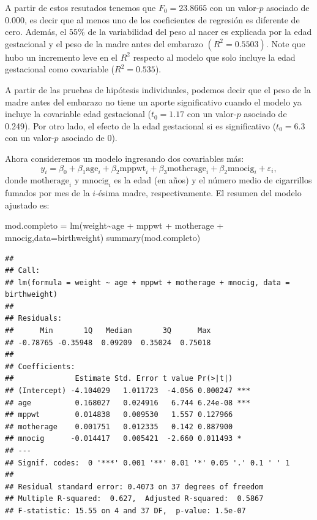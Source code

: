 \documentclass[
]{article}
\newenvironment{Shaded}{\begin{snugshade}}{\end{snugshade}}
\newcommand{\AttributeTok}[1]{\textcolor[rgb]{0.77,0.63,0.00}{#1}}
\newcommand{\FunctionTok}[1]{\textcolor[rgb]{0.00,0.00,0.00}{#1}}
\newcommand{\NormalTok}[1]{#1}
\newcommand{\OtherTok}[1]{\textcolor[rgb]{0.56,0.35,0.01}{#1}}
\newcommand{\SpecialCharTok}[1]{\textcolor[rgb]{0.00,0.00,0.00}{#1}}
\begin{document}
A partir de estos resutados tenemos que \(F_{0}=23.8665\) con un valor-\(p\) asociado de \(0.000\), es decir que al menos uno de los coeficientes de regresión es diferente de cero. Además, el \(55\)\% de la variabilidad del peso al nacer es explicada por la edad gestacional y el peso de la madre antes del embarazo \((R^{2}=0.5503)\). Note que hubo un incremento leve en el \(R^{2}\) respecto al modelo que solo incluye la edad gestacional como covariable (\(R^{2} = 0.535\)).

A partir de las pruebas de hipótesis individuales, podemos decir que el peso de la madre antes del embarazo no tiene un aporte significativo cuando el modelo ya incluye la covariable edad gestacional (\(t_{0}=1.17\) con un valor-\(p\) asociado de 0.249). Por otro lado, el efecto de la edad gestacional si es significativo (\(t_{0}=6.3\) con un valor-\(p\) asociado de 0).

Ahora consideremos un modelo ingresando dos covariables más:
\[
y_{i} = \beta_{0} + \beta_{1}\mbox{age}_{i} + \beta_{2}\mbox{mppwt}_{i} + \beta_{3}\mbox{motherage}_{i} + \beta_{2}\mbox{mnocig}_{i} + \varepsilon_{i},
\]
donde \(\mbox{motherage}_{i}\) y \(\mbox{mnocig}_{i}\) es la edad (en años) y el número medio de cigarrillos fumados por mes de la \(i\)-ésima madre, respectivamente. El resumen del modelo ajustado es:

\begin{Shaded}
\begin{Highlighting}[]
\NormalTok{mod.completo }\OtherTok{=} \FunctionTok{lm}\NormalTok{(weight}\SpecialCharTok{\textasciitilde{}}\NormalTok{age }\SpecialCharTok{+}\NormalTok{ mppwt }\SpecialCharTok{+}\NormalTok{ motherage }\SpecialCharTok{+}\NormalTok{ mnocig,}\AttributeTok{data=}\NormalTok{birthweight)}
\FunctionTok{summary}\NormalTok{(mod.completo)}
\end{Highlighting}
\end{Shaded}

\begin{verbatim}
## 
## Call:
## lm(formula = weight ~ age + mppwt + motherage + mnocig, data = birthweight)
## 
## Residuals:
##      Min       1Q   Median       3Q      Max 
## -0.78765 -0.35948  0.09209  0.35024  0.75018 
## 
## Coefficients:
##              Estimate Std. Error t value Pr(>|t|)    
## (Intercept) -4.104029   1.011723  -4.056 0.000247 ***
## age          0.168027   0.024916   6.744 6.24e-08 ***
## mppwt        0.014838   0.009530   1.557 0.127966    
## motherage    0.001751   0.012335   0.142 0.887900    
## mnocig      -0.014417   0.005421  -2.660 0.011493 *  
## ---
## Signif. codes:  0 '***' 0.001 '**' 0.01 '*' 0.05 '.' 0.1 ' ' 1
## 
## Residual standard error: 0.4073 on 37 degrees of freedom
## Multiple R-squared:  0.627,  Adjusted R-squared:  0.5867 
## F-statistic: 15.55 on 4 and 37 DF,  p-value: 1.5e-07
\end{verbatim}
\end{document}
